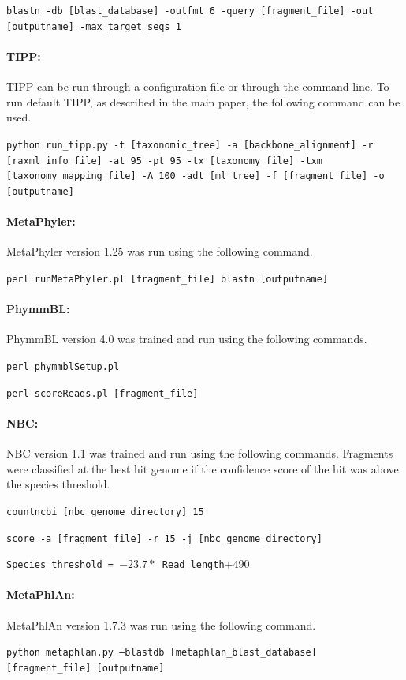 {\tt blastn -db  [blast\_database] -outfmt 6 -query [fragment\_file] -out [outputname] -max\_target\_seqs 1}

\paragraph{TIPP:}

TIPP can be run through a configuration file or through the command line.  To run default TIPP, as described in the main paper, the following command can be used.

{\tt python run\_tipp.py -t [taxonomic\_tree] -a [backbone\_alignment] -r [raxml\_info\_file] -at 95 -pt 95 -tx  [taxonomy\_file] -txm [taxonomy\_mapping\_file] -A 100 -adt [ml\_tree] -f  [fragment\_file] -o [outputname]}

\paragraph{MetaPhyler:}

MetaPhyler version 1.25 was run using the following command.

{\tt perl runMetaPhyler.pl [fragment\_file] blastn [outputname]}

\paragraph{PhymmBL:}

PhymmBL version 4.0 was trained and run using the following commands.

{\tt perl phymmblSetup.pl}

{\tt perl scoreReads.pl [fragment\_file]}

\paragraph{NBC:}

NBC version 1.1 was trained and run using the following commands.  Fragments were classified at the best hit genome if the confidence score of the hit was above the species threshold.

{\tt countncbi [nbc\_genome\_directory] 15}

{\tt score -a [fragment\_file] -r 15 -j [nbc\_genome\_directory]}

{\tt Species\_threshold = $-23.7*$ Read\_length$+490$}

\paragraph{MetaPhlAn:}

MetaPhlAn version 1.7.3 was run using the following command.

{\tt python metaphlan.py --blastdb [metaphlan\_blast\_database] [fragment\_file] [outputname]}
\newpage

